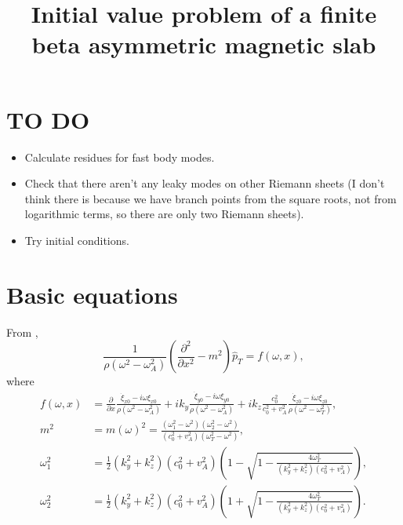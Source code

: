 \documentclass[12pt]{article}
\title{Initial value problem of a finite beta asymmetric magnetic slab}
\date{}
\begin{document}
\maketitle

\section{TO DO}
\begin{itemize}
	\item Calculate residues for fast body modes.
	\item Check that there aren't any leaky modes on other Riemann sheets (I don't think there is because we have branch points from the square roots, not from logarithmic terms, so there are only two Riemann sheets).
	\item Try initial conditions.
\end{itemize}

\section{Basic equations}
From \cite{and_etal07},
\begin{equation}
\frac{1}{\rho(\omega^2 - \omega_A^2)} \left( \frac{\partial^2}{\partial x^2} - m^2 \right) \hat{p}_T = f(\omega, x),
\end{equation}
where
\begin{align}
f(\omega, x) &= \frac{\partial}{\partial x} \frac{\dot{\xi}_{x0} - i\omega\xi_{x0}}{\rho(\omega^2 - \omega_A^2)} + ik_y \frac{\dot{\xi}_{y0} - i\omega\xi_{y0}}{\rho(\omega^2 - \omega_A^2)} + ik_z \frac{c_0^2}{c_0^2 + v_A^2} \frac{\dot{\xi}_{z0} - i\omega\xi_{z0}}{\rho(\omega^2 - \omega_T^2)}, \\
m^2 &= m(\omega)^2 = \frac{(\omega_1^2 - \omega^2)(\omega_2^2 - \omega^2)}{(c_0^2 + v_A^2)(\omega_T^2 - \omega^2)}, \\
\omega_1^2 &= \frac{1}{2}(k_y^2 + k_z^2)(c_0^2 + v_A^2) \left( 1 - \sqrt{1 - \frac{4\omega_T^2}{(k_y^2 + k_z^2)(c_0^2 + v_A^2)}} \right), \\
\omega_2^2 &= \frac{1}{2}(k_y^2 + k_z^2)(c_0^2 + v_A^2) \left( 1 + \sqrt{1 - \frac{4\omega_T^2}{(k_y^2 + k_z^2)(c_0^2 + v_A^2)}} \right).
\end{align}
\end{document}
